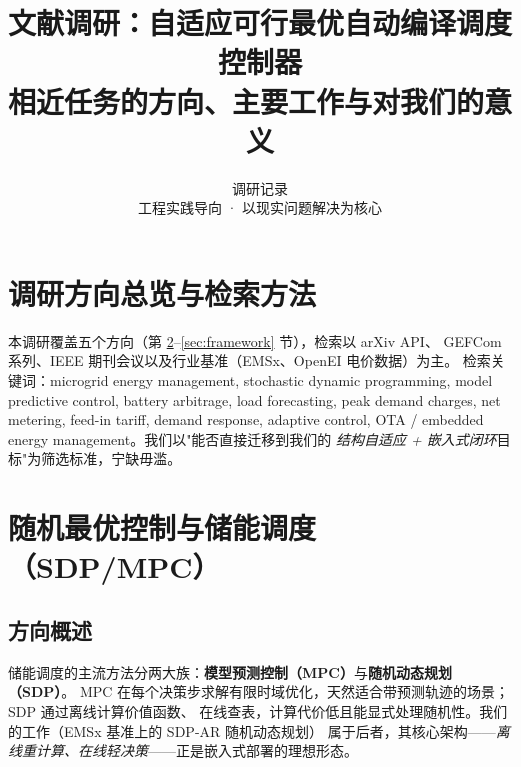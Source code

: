 \documentclass[10pt, twocolumn]{article}
\title{\textbf{文献调研：自适应可行最优自动编译调度控制器}\\[0.4em]
\large 相近任务的方向、主要工作与对我们的意义}
\author{调研记录\\[0.2em]\small 工程实践导向 · 以现实问题解决为核心}
\date{}
\begin{document}

\section{调研方向总览与检索方法}
本调研覆盖五个方向（第 \ref{sec:sdp}--\ref{sec:framework} 节），检索以 arXiv API、
GEFCom 系列、IEEE 期刊会议以及行业基准（EMSx、OpenEI 电价数据）为主。
检索关键词：microgrid energy management, stochastic dynamic programming,
model predictive control, battery arbitrage, load forecasting, peak demand
charges, net metering, feed-in tariff, demand response, adaptive control,
OTA / embedded energy management。我们以"能否直接迁移到我们的
\emph{结构自适应 + 嵌入式闭环}目标"为筛选标准，宁缺毋滥。

\section{随机最优控制与储能调度（SDP/MPC）}\label{sec:sdp}

\subsection{方向概述}
储能调度的主流方法分两大族：\textbf{模型预测控制（MPC）}与\textbf{随机动态规划（SDP）}。
MPC 在每个决策步求解有限时域优化，天然适合带预测轨迹的场景；SDP 通过离线计算价值函数、
在线查表，计算代价低且能显式处理随机性。我们的工作（EMSx 基准上的 SDP-AR 随机动态规划）
属于后者，其核心架构——\emph{离线重计算、在线轻决策}——正是嵌入式部署的理想形态。
\end{document}
